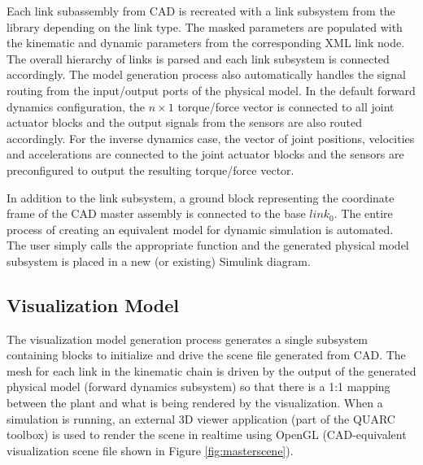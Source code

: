 Each link subassembly from CAD is recreated with a link subsystem from the library depending on the link type. The masked parameters are populated with the kinematic and dynamic parameters from the corresponding XML link node. The overall hierarchy of links is parsed and each link subsystem is connected accordingly. The model generation process also automatically handles the signal routing from the input/output ports of the physical model. In the default forward dynamics configuration, the $n \times 1$ torque/force vector is connected to all joint actuator blocks and the output signals from the sensors are also routed accordingly. For the inverse dynamics case, the vector of joint positions, velocities and accelerations are connected to the joint actuator blocks and the sensors are preconfigured to output the resulting torque/force vector.

In addition to the link subsystem, a ground block representing the coordinate frame of the CAD master assembly is connected to the base $link_{0}$. The entire process of creating an equivalent model for dynamic simulation is automated. The user simply calls the appropriate function and the generated physical model subsystem is placed in a new (or existing) Simulink diagram.

\subsection{Visualization Model} %
\label{sub:visualization_model}
The visualization model generation process generates a single subsystem containing blocks to initialize and drive the scene file generated from CAD. The mesh for each link in the kinematic chain is driven by the output of the generated physical model (forward dynamics subsystem) so that there is a 1:1 mapping between the plant and what is being rendered by the visualization. When a simulation is running, an external 3D viewer application (part of the QUARC toolbox) is used to render the scene in realtime using OpenGL (CAD-equivalent visualization scene file shown in Figure \ref{fig:masterscene}).

